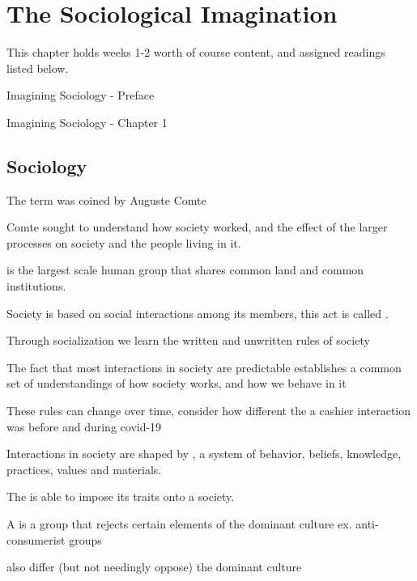 \chapter{The Sociological Imagination}

This chapter holds weeks 1-2 worth of course content, and assigned readings listed below.
\begin{bullets}
	\item Imagining Sociology - Preface
	\item Imagining Sociology - Chapter 1
\end{bullets}

\section{Sociology}

The term  was coined by Auguste Comte
\begin{bullets}
	\item Comte sought to understand how society worked, and the effect of the larger processes on society and the people living in it.
	\item {} is the largest scale human group that shares common land and common institutions.
\end{bullets}

Society is based on social interactions among its members, this act is called .
\begin{bullets}
	\item Through socialization we learn the written and unwritten rules of society
	\item The fact that most interactions in society are predictable establishes a common set of understandings of how society works, and how we behave in it
	\item These rules can change over time, consider how different the a cashier interaction was before and during covid-19
\end{bullets}

Interactions in society are shaped by , a system of behavior, beliefs, knowledge, practices, values and materials.
\begin{bullets}
	\item The  is able to impose its traits onto a society.
	\item A  is a group that rejects certain elements of the dominant culture ex. anti-consumerist groups
	\item {} also differ (but not needingly oppose) the dominant culture
\end{bullets}

